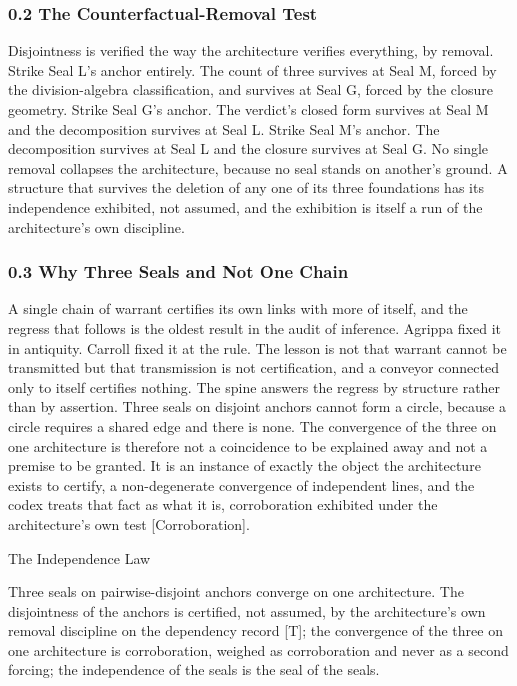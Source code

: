 \documentclass[10pt,twocolumn]{article}
\begin{document}
\hypertarget{the-counterfactual-removal-test}{%
\subsubsection{0.2 The Counterfactual-Removal
Test}\label{the-counterfactual-removal-test}}

Disjointness is verified the way the architecture verifies everything,
by removal. Strike Seal L's anchor entirely. The count of three survives
at Seal M, forced by the division-algebra classification, and survives
at Seal G, forced by the closure geometry. Strike Seal G's anchor. The
verdict's closed form survives at Seal M and the decomposition survives
at Seal L. Strike Seal M's anchor. The decomposition survives at Seal L
and the closure survives at Seal G. No single removal collapses the
architecture, because no seal stands on another's ground. A structure
that survives the deletion of any one of its three foundations has its
independence exhibited, not assumed, and the exhibition is itself a run
of the architecture's own discipline.

\hypertarget{why-three-seals-and-not-one-chain}{%
\subsubsection{0.3 Why Three Seals and Not One
Chain}\label{why-three-seals-and-not-one-chain}}

A single chain of warrant certifies its own links with more of itself,
and the regress that follows is the oldest result in the audit of
inference. Agrippa fixed it in antiquity. Carroll fixed it at the rule.
The lesson is not that warrant cannot be transmitted but that
transmission is not certification, and a conveyor connected only to
itself certifies nothing. The spine answers the regress by structure
rather than by assertion. Three seals on disjoint anchors cannot form a
circle, because a circle requires a shared edge and there is none. The
convergence of the three on one architecture is therefore not a
coincidence to be explained away and not a premise to be granted. It is
an instance of exactly the object the architecture exists to certify, a
non-degenerate convergence of independent lines, and the codex treats
that fact as what it is, corroboration exhibited under the
architecture's own test {[}Corroboration{]}.

\begin{jbox}{The Independence Law}

Three seals on pairwise-disjoint anchors converge on one architecture.
The disjointness of the anchors is certified, not assumed, by the
architecture's own removal discipline on the dependency record {[}T{]};
the convergence of the three on one architecture is corroboration,
weighed as corroboration and never as a second forcing; the independence
of the seals is the seal of the seals.

\end{jbox}
\end{document}
